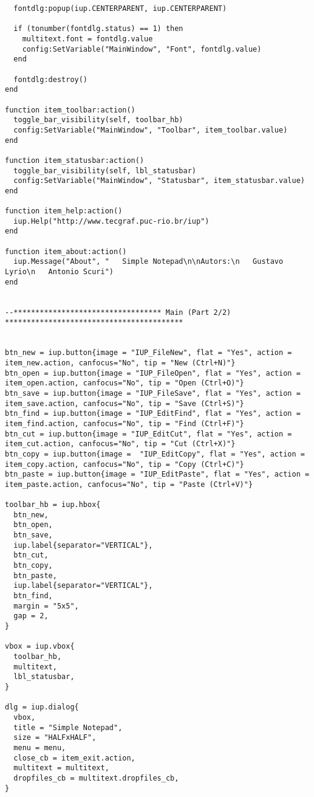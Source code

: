 \documentclass{ctexart}
\begin{document}
\begin{lstlisting}
  fontdlg:popup(iup.CENTERPARENT, iup.CENTERPARENT)

  if (tonumber(fontdlg.status) == 1) then
    multitext.font = fontdlg.value
    config:SetVariable("MainWindow", "Font", fontdlg.value)
  end

  fontdlg:destroy()
end

function item_toolbar:action()
  toggle_bar_visibility(self, toolbar_hb)
  config:SetVariable("MainWindow", "Toolbar", item_toolbar.value)
end

function item_statusbar:action()
  toggle_bar_visibility(self, lbl_statusbar)
  config:SetVariable("MainWindow", "Statusbar", item_statusbar.value)
end

function item_help:action()
  iup.Help("http://www.tecgraf.puc-rio.br/iup")
end

function item_about:action()
  iup.Message("About", "   Simple Notepad\n\nAutors:\n   Gustavo Lyrio\n   Antonio Scuri")
end


--********************************** Main (Part 2/2) *****************************************


btn_new = iup.button{image = "IUP_FileNew", flat = "Yes", action = item_new.action, canfocus="No", tip = "New (Ctrl+N)"}
btn_open = iup.button{image = "IUP_FileOpen", flat = "Yes", action = item_open.action, canfocus="No", tip = "Open (Ctrl+O)"}
btn_save = iup.button{image = "IUP_FileSave", flat = "Yes", action = item_save.action, canfocus="No", tip = "Save (Ctrl+S)"}
btn_find = iup.button{image = "IUP_EditFind", flat = "Yes", action = item_find.action, canfocus="No", tip = "Find (Ctrl+F)"}
btn_cut = iup.button{image = "IUP_EditCut", flat = "Yes", action = item_cut.action, canfocus="No", tip = "Cut (Ctrl+X)"}
btn_copy = iup.button{image =  "IUP_EditCopy", flat = "Yes", action = item_copy.action, canfocus="No", tip = "Copy (Ctrl+C)"}
btn_paste = iup.button{image = "IUP_EditPaste", flat = "Yes", action = item_paste.action, canfocus="No", tip = "Paste (Ctrl+V)"}

toolbar_hb = iup.hbox{
  btn_new,
  btn_open,
  btn_save,
  iup.label{separator="VERTICAL"},
  btn_cut,
  btn_copy,
  btn_paste,
  iup.label{separator="VERTICAL"},
  btn_find, 
  margin = "5x5",
  gap = 2,
}

vbox = iup.vbox{
  toolbar_hb,
  multitext,
  lbl_statusbar,
}

dlg = iup.dialog{
  vbox,
  title = "Simple Notepad",
  size = "HALFxHALF",
  menu = menu,
  close_cb = item_exit.action,
  multitext = multitext,
  dropfiles_cb = multitext.dropfiles_cb,
}


\end{lstlisting}
\end{document}
